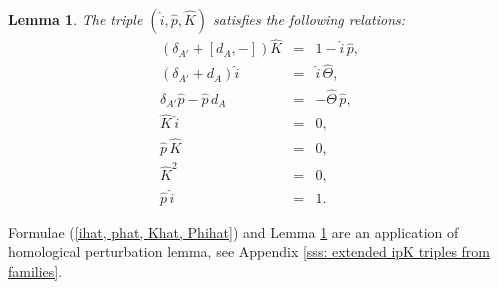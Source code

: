 \documentclass[11pt,a4paper]{amsart}
\theoremstyle{plain} %
\newtheorem{lem}[thm]{Lemma}
\theoremstyle{definition}
\theoremstyle{remark}
\newcommand{\mr}{\mathrm}
\newcommand{\wh}{\widehat}
\newcommand{\ad}{\mathrm{ad}}
\begin{document}
{\begin{lem}\label{lemma: ipK hat}
The triple $(\wh{i},\wh{p},\wh{K})$ satisfies the following relations:
\begin{subequations}
\begin{eqnarray}
    (\delta_{A'}+[d_A,-])\wh{K} &=&1-\wh{i}\,\wh{p},  \label{ipK hat a} \\
    (\delta_{A'}+d_A)\wh{i} &=& \wh{i}\, \wh\Theta, \label{ipK hat b}\\
    \delta_{A'} \wh{p} - \wh{p}\, d_A &=&  -\wh\Theta\, \wh{p}, \label{ipK hat c}\\
    \wh{K}\, \wh{i} &=& 0,\label{ipK hat d}\\
    \wh{p}\, \wh{K} &=& 0, \label{ipK hat e}\\
    \wh{K}^2 &=& 0, \label{ipK hat f}\\
    \wh{p} \,\wh{i} &=& 1. \label{ipk hat pi=1}
\end{eqnarray}
\end{subequations}

\end{lem}
Formulae (\ref{ihat, phat, Khat, Phihat}) and Lemma \ref{lemma: ipK hat} are an application of homological perturbation lemma, see Appendix \ref{sss: extended ipK triples from families}.

}
\end{document}
